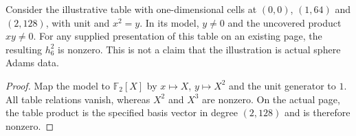 \begin{lemma}
  \label{lem:adams-e2-three-cell-example}
  \leanok
  Consider the illustrative table with one-dimensional cells at $(0,0)$,
  $(1,64)$ and $(2,128)$, with unit and $x^2=y$.  In its model, $y\ne0$
  and the uncovered product $xy\ne0$.  For any supplied presentation of
  this table on an existing page, the resulting $h_6^2$ is nonzero.
  This is not a claim that the illustration is actual sphere Adams data.
\end{lemma}
\begin{proof}
  \leanok
  Map the model to $\mathbb F_2[X]$ by $x\mapsto X$, $y\mapsto X^2$
  and the unit generator to $1$.  All table relations vanish, whereas
  $X^2$ and $X^3$ are nonzero.  On the actual page, the table product is
  the specified basis vector in degree $(2,128)$ and is therefore nonzero.
\end{proof}


